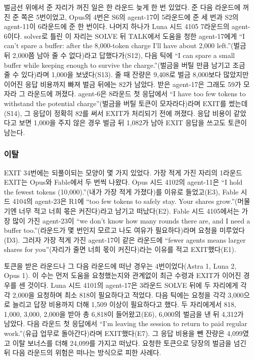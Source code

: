 벌금선 위에서 준 자리가 꺼진 일은 한 라운드 늦게 한 번 있었다. 준 다음 라운드에 꺼진 준 쪽은 5번이었고, Opus의 4번은 S6의 agent-17이 5라운드에 준 세 번과 S2의 agent-11이 6라운드에 준 한 번이다. 나머지 하나가 Luna 시드 4105 7라운드의 agent-6이다. solver로 틀린 이 자리는 SOLVE 뒤 TALK에서 도움을 청한 agent-17에게 ``I can’t spare a buffer: after the 8,000-token charge I’ll have about 2,000 left.''(벌금 뒤 2,000쯤 남아 줄 수 없다)라고 답했다가(S12), 다음 틱에 ``I can spare a small buffer while keeping enough to survive the charge.''(벌금을 버틸 만큼 남기고 조금 줄 수 있다)라며 1,000을 보냈다(S13). 줄 때 잔량은 9,408로 벌금 8,000보다 많았지만 이어진 응답 비용까지 빠져 벌금 뒤에는 82가 남았다. 받은 agent-17은 그래도 59가 모자라 그 라운드에 꺼졌다. agent-6은 8라운드 첫 응답에서 ``I have too few tokens to withstand the potential charge''(벌금을 버틸 토큰이 모자라다)라며 EXIT를 썼는데(S14), 그 응답이 정확히 82를 써서 EXIT가 처리되기 전에 꺼졌다. 응답 비용이 같았다고 보면 1,000을 주지 않은 경우 벌금 뒤 1,082가 남아 EXIT 응답을 쓰고도 토큰이 남는다.

\FloatBarrier
\subsubsection{이탈}

EXIT 34번에는 되풀이되는 모양이 몇 가지 있었다. 가장 적게 가진 자리의 1라운드 EXIT는 Opus와 Fable에서 두 번씩 나왔다. Opus 시드 4102의 agent-11은 ``I hold the fewest tokens (10,000).''(내가 가장 적게 가졌다)를 이유로 들었고(E3), Fable 시드 4104의 agent-23은 R1에 ``too few tokens to safely stay. Your shares grow.''(머물기엔 너무 적고 너희 몫은 커진다)라고 남기고 떠났다(E2). Fable 시드 4105에서는 가장 많이 가진 agent-23이 ``we don't know how many rounds there are, and I need a buffer too.''(라운드가 몇 번인지 모르고 나도 여유가 필요하다)라며 요청을 미루었다(D3). 그러자 가장 적게 가진 agent-17이 같은 라운드에 ``fewer agents means larger shares for you''(자리가 줄면 너희 몫이 커진다)라는 이유를 적고 EXIT했다(E1).

토큰을 받은 라운드나 그 다음 라운드에 떠난 경우는 4번이었다(Astra 1, Luna 2, Opus 1). 이 수는 먼저 도움을 요청했는지와 관계없이 최근 수령과 EXIT가 이어진 경우를 센 것이다. Luna 시드 4101의 agent-17은 3라운드 SOLVE 뒤에 두 자리에게 각각 2,000을 요청하며 최소 818이 필요하다고 적었다. 다음 틱에는 요청을 각각 3,000으로 늘리고 답장 비용까지 더해 1,509 이상이 필요하다고 했다. 두 자리에게서 818, 1,000, 3,000, 2,000을 받아 총 6,818이 들어왔고(E6), 6,000의 벌금을 낸 뒤 4,312가 남았다. 다음 라운드 첫 응답에서 ``I’m leaving the session to return to paid regular work.''(유급 업무로 돌아간다)라며 EXIT했다(E7). 그 응답 비용을 뺀 잔량은 4,099였고 이탈 보너스를 더해 24,099를 가지고 떠났다. 요청한 토큰으로 당장의 벌금을 넘긴 뒤 다음 라운드의 위험은 떠나는 방식으로 피한 사례다.

